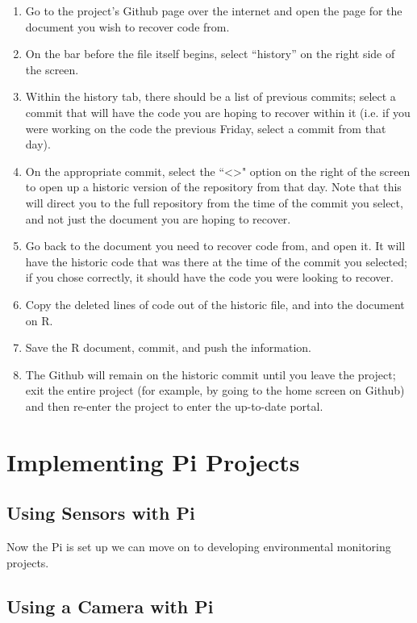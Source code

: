 \documentclass{article}\usepackage[]{graphicx}\usepackage[]{color}
\begin{document}
\begin{enumerate}

\item Go to the project's Github page over the internet and open the page for the document you wish to recover code from.

\item On the bar before the file itself begins, select ``history'' on the right side of the screen.

\item Within the history tab, there should be a list of previous commits; select a commit that will have the code you are hoping to recover within it (i.e. if you were working on the code the previous Friday, select a commit from that day).

\item On the appropriate commit, select the ``<>" option on the right of the screen to open up a historic version of the repository from that day.  Note that this will direct you to the full repository from the time of the commit you select, and not just the document you are hoping to recover.

\item Go back to the document you need to recover code from, and open it.  It will have the historic code that was there at the time of the commit you selected; if you chose correctly, it should have the code you were looking to recover.

\item Copy the deleted lines of code out of the historic file, and into the document on R. 

\item Save the R document, commit, and push the information.  

\item The Github will remain on the historic commit until you leave the project; exit the entire project (for example, by going to the home screen on Github) and then re-enter the project to enter the up-to-date portal.

\end{enumerate}


\section{Implementing Pi Projects}

\subsection{Using Sensors with Pi}

Now the Pi is set up we can move on to developing environmental monitoring projects. 
\subsection{Using a Camera with Pi}
\end{document}
